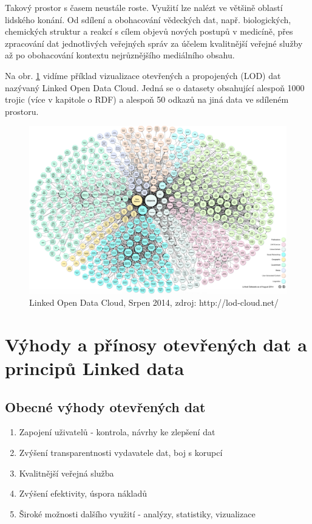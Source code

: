 Takový prostor s časem neustále roste. Využití lze nalézt ve většině oblastí lidského konání. Od sdílení a obohacování vědeckých dat, např. biologických, chemických struktur a reakcí s cílem objevů nových postupů v medicíně, přes zpracování dat jednotlivých veřejných správ za účelem kvalitnější veřejné služby až po obohacování kontextu nejrůznějšího mediálního obsahu. 

Na obr. \ref{obr:lodcloud} vidíme příklad vizualizace otevřených a propojených (LOD) dat nazývaný Linked Open Data Cloud. Jedná se o datasety obsahující alespoň 1000 trojic (více v kapitole o RDF) a alespoň 50 odkazů na jiná data ve sdíleném prostoru.  

\begin{figure}[h]
\centerline{\includegraphics[width=\textwidth]{img/lodcloud.eps}}
\caption{Linked Open Data Cloud, Srpen 2014, zdroj: http://lod-cloud.net/}
\label{obr:lodcloud}
\end{figure}

\section{Výhody a přínosy otevřených dat a principů Linked data}

\subsection*{Obecné výhody otevřených dat}

\begin{enumerate}
\item Zapojení uživatelů - kontrola, návrhy ke zlepšení dat   
\item Zvýšení transparentnosti vydavatele dat, boj s korupcí
\item Kvalitnější veřejná služba
\item Zvýšení efektivity, úspora nákladů
\item Široké možnosti dalšího využití - analýzy, statistiky, vizualizace
\end{enumerate}

